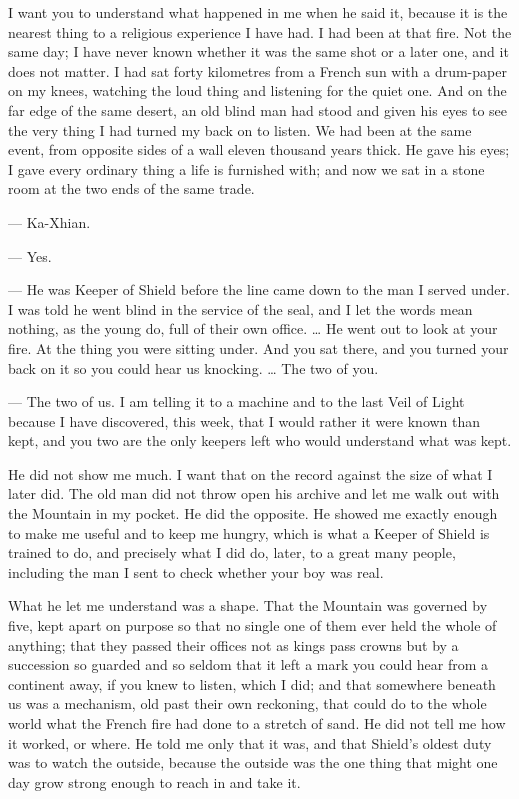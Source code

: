 I want you to understand what happened in me when he said it, because it is the nearest thing to a religious experience I have had. I had been at that fire. Not the same day; I have never known whether it was the same shot or a later one, and it does not matter. I had sat forty kilometres from a French sun with a drum-paper on my knees, watching the loud thing and listening for the quiet one. And on the far edge of the same desert, an old blind man had stood and given his eyes to see the very thing I had turned my back on to listen. We had been at the same event, from opposite sides of a wall eleven thousand years thick. He gave his eyes; I gave every ordinary thing a life is furnished with; and now we sat in a stone room at the two ends of the same trade.\par

\begin{room}

--- Ka-Xhian.

--- Yes.

--- He was Keeper of Shield before the line came down to the man I served under. I was told he went blind in the service of the seal, and I let the words mean nothing, as the young do, full of their own office. \ldots{} He went out to look at your fire. At the thing you were sitting under. And you sat there, and you turned your back on it so you could hear us knocking. \ldots{} The two of you.

--- The two of us. I am telling it to a machine and to the last Veil of Light because I have discovered, this week, that I would rather it were known than kept, and you two are the only keepers left who would understand what was kept.

\end{room}

He did not show me much. I want that on the record against the size of what I later did. The old man did not throw open his archive and let me walk out with the Mountain in my pocket. He did the opposite. He showed me exactly enough to make me useful and to keep me hungry, which is what a Keeper of Shield is trained to do, and precisely what I did do, later, to a great many people, including the man I sent to check whether your boy was real.\par

What he let me understand was a shape. That the Mountain was governed by five, kept apart on purpose so that no single one of them ever held the whole of anything; that they passed their offices not as kings pass crowns but by a succession so guarded and so seldom that it left a mark you could hear from a continent away, if you knew to listen, which I did; and that somewhere beneath us was a mechanism, old past their own reckoning, that could do to the whole world what the French fire had done to a stretch of sand. He did not tell me how it worked, or where. He told me only that it was, and that Shield's oldest duty was to watch the outside, because the outside was the one thing that might one day grow strong enough to reach in and take it.\par

